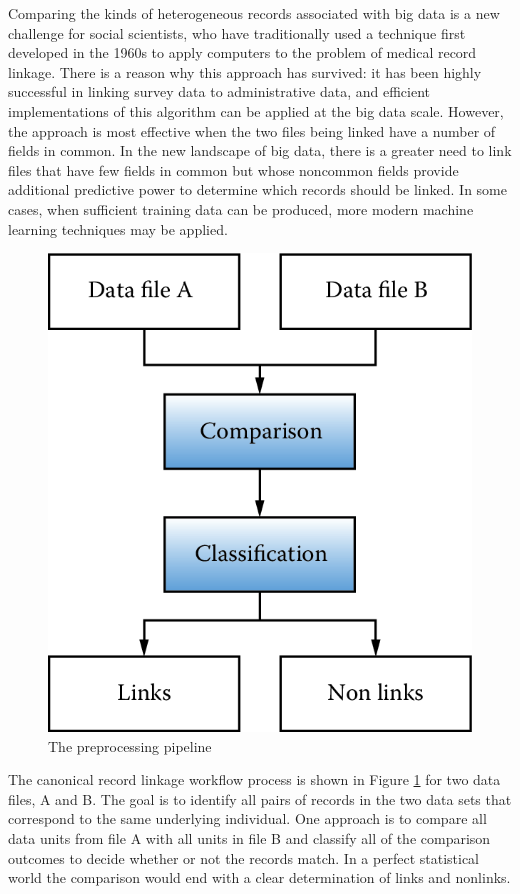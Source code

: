 \documentclass[]{krantz}
\begin{document}
Comparing the kinds of heterogeneous records associated with big data is
a new challenge for social scientists, who have traditionally used a
technique first developed in the 1960s to apply computers to the problem
of medical record linkage. There is a reason why this approach has
survived: it has been highly successful in linking survey data to
administrative data, and efficient implementations of this algorithm can
be applied at the big data scale. However, the approach is most
effective when the two files being linked have a number of fields in
common. In the new landscape of big data, there is a greater need to
link files that have few fields in common but whose noncommon fields
provide additional predictive power to determine which records should be
linked. In some cases, when sufficient training data can be produced,
more modern machine learning techniques may be applied.

\begin{figure}

{\centering \includegraphics[width=0.7\linewidth]{ChapterLinkage/figures/fig3-1} 

}

\caption{The preprocessing pipeline}\label{fig:fig3-1}
\end{figure}

The canonical record linkage workflow process is shown in Figure
\ref{fig:fig3-1} for two data files, A and B. The goal is to identify
all pairs of records in the two data sets that correspond to the same
underlying individual. One approach is to compare all data units from
file A with all units in file B and classify all of the comparison
outcomes to decide whether or not the records match. In a perfect
statistical world the comparison would end with a clear determination of
links and nonlinks.
\end{document}

